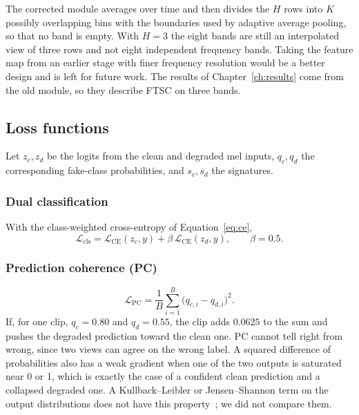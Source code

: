The corrected module averages over time and then divides the $H$ rows into $K$ possibly overlapping bins with the boundaries used by adaptive average pooling, so that no band is empty. With $H=3$ the eight bands are still an interpolated view of three rows and not eight independent frequency bands. Taking the feature map from an earlier stage with finer frequency resolution would be a better design and is left for future work. The results of Chapter~\ref{ch:results} come from the old module, so they describe FTSC on three bands.



\subsection{Loss functions}
\label{sec:losses}

Let $z_c, z_d$ be the logits from the clean and degraded mel inputs, $q_c, q_d$ the corresponding fake-class probabilities, and $s_c, s_d$ the signatures.

\subsubsection{Dual classification}

With the class-weighted cross-entropy of Equation~\eqref{eq:ce},
\begin{equation}
\mathcal{L}_{\mathrm{cls}} = \mathcal{L}_{\mathrm{CE}}(z_c, y) + \beta\,\mathcal{L}_{\mathrm{CE}}(z_d, y), \qquad \beta = 0.5 .
\label{eq:cls}
\end{equation}

\subsubsection{Prediction coherence (PC)}

\begin{equation}
\mathcal{L}_{\mathrm{PC}} = \frac{1}{B}\sum_{i=1}^{B} \big(q_{c,i} - q_{d,i}\big)^2 .
\label{eq:pc}
\end{equation}
If, for one clip, $q_c=0.80$ and $q_d=0.55$, the clip adds $0.0625$ to the sum and pushes the degraded prediction toward the clean one. PC cannot tell right from wrong, since two views can agree on the wrong label. A squared difference of probabilities also has a weak gradient when one of the two outputs is saturated near 0 or 1, which is exactly the case of a confident clean prediction and a collapsed degraded one. A Kullback--Leibler or Jensen--Shannon term on the output distributions does not have this property~\cite{hendrycks2020augmix}; we did not compare them.

